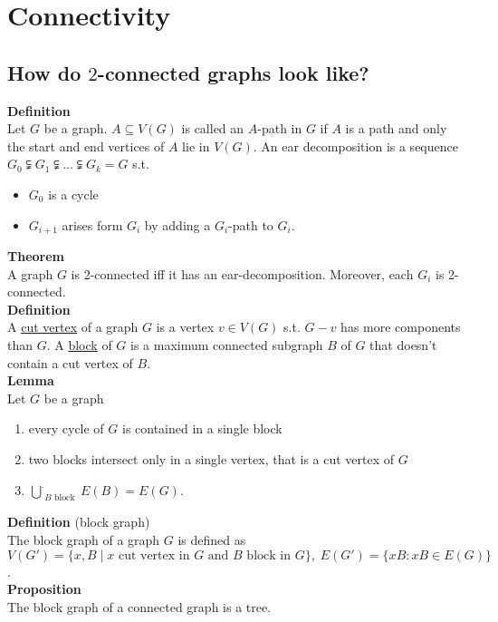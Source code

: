 \documentclass[a4paper, 12pt]{article}
\begin{document}
	\section{Connectivity}
	\subsection{How do $2$-connected graphs look like?}
	\textbf{Definition}\\
	Let $G$ be a graph. $A \subseteq V(G)$ is called an $A$-path in $G$ if $A$ is a path and only the start and end vertices of $A$ lie in $V(G)$. An ear decomposition is a sequence $G_0 \subsetneqq G_1 \subsetneqq ... \subsetneqq G_k = G$ s.t. \begin{itemize}
		\item $G_0$ is a cycle
		\item $G_{i+1}$ arises form $G_i$ by adding a $G_i$-path to $G_i$.
	\end{itemize}  
	\textbf{Theorem}\\
	A graph $G$ is 2-connected iff it has an ear-decomposition. Moreover, each $G_i$ is 2-connected.\\
	\textbf{Definition}\\
	A \underline{cut vertex} of a graph $G$ is a vertex $v \in V(G)$ s.t. $G-v$ has more components than $G$. A \underline{block} of $G$ is a maximum connected subgraph $B$ of $G$ that doesn't contain a cut vertex of $B$.\\
	\textbf{Lemma}\\
	Let $G$ be a graph \begin{enumerate}
		\item every cycle of $G$ is contained in a single block
		\item two blocks intersect only in a single vertex, that is a cut vertex of $G$
		\item $\overset{.}{\bigcup}_{B \text{ block }} E(B) = E(G)$.
	\end{enumerate}
	\textbf{Definition} (block graph)\\
	The block graph of a graph $G$ is defined as \[V(G') = \{x, B\; |\; x \text{ cut vertex in $G$ and } B \text{ block in $G$}\}, \; E(G') = \{xB: xB \in E(G)\}\].\\
	\textbf{Proposition}\\
	The block graph of a connected graph is a  tree.
\end{document}
